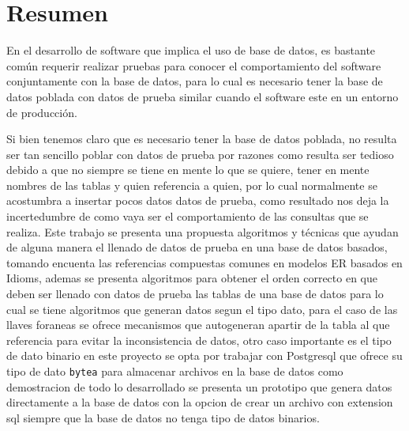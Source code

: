 \chapter*{Resumen}
\thispagestyle{empty}
\renewcommand{\footrulewidth}{0.0pt}%
En el desarrollo de software que implica el uso de base de datos, es bastante com\'un requerir realizar pruebas para conocer el comportamiento del software conjuntamente con la base de datos, para lo cual es necesario tener la base de datos poblada con datos de prueba similar cuando el software este en un entorno de producci\'on. 

Si bien tenemos claro que es necesario tener la base de datos poblada, no resulta ser tan sencillo poblar con datos de prueba por razones como resulta ser tedioso debido a que no siempre se tiene en mente lo que se quiere, tener en mente nombres de las tablas y quien referencia a quien, por lo cual normalmente se acostumbra a insertar pocos datos datos de prueba, como resultado nos deja la incertedumbre de como vaya ser el comportamiento de las consultas que se realiza. Este trabajo se presenta una propuesta algoritmos y t\'ecnicas  que ayudan de alguna manera el llenado de datos de prueba en una base de datos basados, tomando encuenta las referencias compuestas comunes en modelos ER basados en Idioms, ademas se presenta algoritmos para obtener el orden correcto en que deben ser llenado con datos de prueba las tablas de una base de datos para lo cual se tiene algoritmos que generan datos segun el tipo dato, para el caso de las llaves foraneas se ofrece mecanismos que autogeneran apartir de la tabla al que referencia para evitar la inconsistencia de datos, otro caso importante es el tipo de dato binario en este proyecto se opta por trabajar con Postgresql que ofrece su tipo de dato \texttt{bytea} para almacenar archivos en la base de datos como demostracion de todo lo desarrollado se presenta un prototipo que genera datos directamente a la base de datos con la opcion de crear un archivo con extension sql siempre que la base de datos no tenga tipo de datos binarios.
